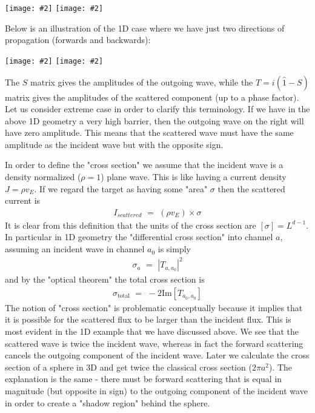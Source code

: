 \documentclass[onecolumn,fleqn]{revtex4}
\newcommand{\im}{\mathrm{Im}}
\newcommand{\tbox}[1]{\text{#1}}
\newcommand{\putgraph}[2][0.30\hsize]{\texttt{[image: \#2]}}
\newcommand{\beq}{\begin{eqnarray}}
\newcommand{\eeq}{\end{eqnarray}}
\begin{document}
\begin{center}
\putgraph[0.3\hsize]{ScatteringIngoingOutgoing} 
\hspace{0.1\hsize}
\putgraph[0.4\hsize]{ScatteringIncidentScattered}
\end{center}

Below is an illustration of the 1D case 
where we have just two directions of propagation 
(forwards and backwards):

\begin{center}
\putgraph[0.45\hsize]{ScatteringBarrier2} 
\hspace{0.05\hsize}
\putgraph[0.45\hsize]{ScatteringBarrier1}
\end{center}


The $S$ matrix gives the amplitudes  
of the outgoing wave, while the $T = i(\hat{1}-S)$ 
matrix gives the amplitudes of the 
scattered component (up to a phase factor).
Let us consider extreme case in order to clarify 
this terminology. If we have in the above 1D geometry 
a very high barrier, then the outgoing wave on the right 
will have zero amplitude.  This means that 
the scattered wave must have the same 
amplitude as the incident wave but with 
the opposite sign.


In order to define the "cross section" we assume that 
the incident wave is a density normalized ($\rho=1$) 
plane wave. This is like having a current density 
$J=\rho v_E$. If we regard the target as having 
some "area" $\sigma$ then the scattered current is 
\beq
I_{scattered} \,\, =  \,\,  (\rho v_E) \times \sigma 
\eeq
It is clear from this definition that the units 
of the cross section are $[\sigma]=L^{d-1}$. 
In particular in 1D geometry the "differential 
cross section" into channel $a$, assuming an incident 
wave in channel $a_0$ is simply 
\beq
\sigma_a \,\, =  \,\,  |T_{a,a_0}|^2 
\eeq
and by the "optical theorem" the total cross section is 
\beq
\sigma_{\tbox{total}} \,\, =  \,\,  -2\im[T_{a_0,a_0}]
\eeq
The notion of "cross section" is problematic 
conceptually because it implies that it is possible for 
the scattered flux to be larger than 
the incident flux. This is most evident in the 1D 
example that we have discussed above. We see that the 
scattered wave is twice the incident wave,  
whereas in fact the forward scattering cancels the 
outgoing component of the incident wave. 
Later we calculate the cross section of a sphere 
in 3D and get twice the classical cross section ($2\pi a^2$). 
The explanation is the same - there must be 
forward scattering that is equal in magnitude 
(but opposite in sign) to the outgoing component 
of the incident wave in order to create a "shadow region" 
behind the sphere. 
\end{document}
